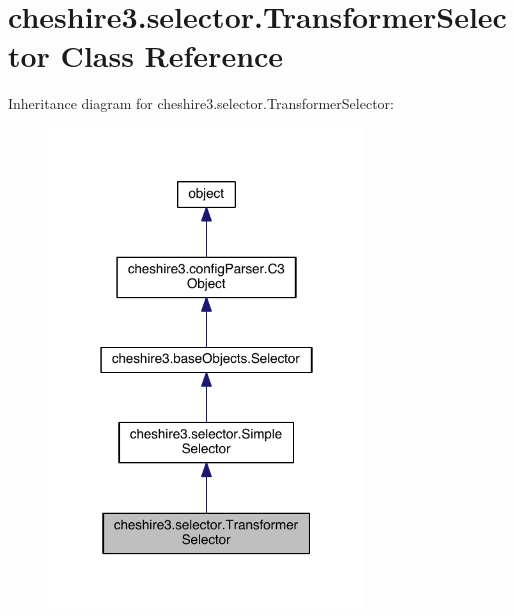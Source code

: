 \hypertarget{classcheshire3_1_1selector_1_1_transformer_selector}{\section{cheshire3.\-selector.\-Transformer\-Selector Class Reference}
\label{classcheshire3_1_1selector_1_1_transformer_selector}
}


Inheritance diagram for cheshire3.\-selector.\-Transformer\-Selector\-:
\nopagebreak
\begin{figure}[H]
\begin{center}
\leavevmode
\includegraphics[width=238pt]{classcheshire3_1_1selector_1_1_transformer_selector__inherit__graph}
\end{center}
\end{figure}


